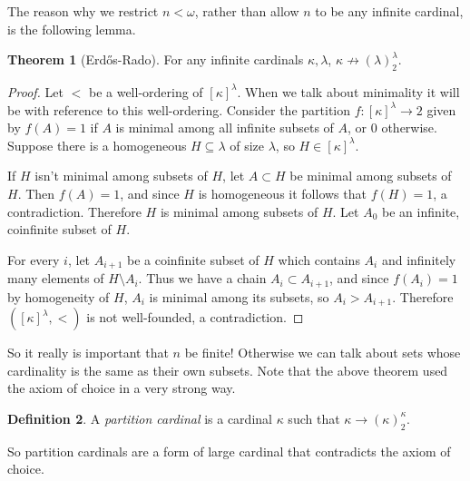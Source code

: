 \documentclass[12pt]{report}
\newcommand{\dfn}[1]{\emph{#1}\index{#1}}
\theoremstyle{definition}
\newtheorem{theorem}{Theorem}[chapter]
\newtheorem{definition}[theorem]{Definition}
\begin{document}
The reason why we restrict $n < \omega$, rather than allow $n$ to be any infinite cardinal, is the following lemma.
\begin{theorem}[Erdős-Rado]
For any infinite cardinals $\kappa,\lambda$, $\kappa \not\to (\lambda)^\lambda_2$.
\end{theorem}
\begin{proof}
Let $<$ be a well-ordering of $[\kappa]^\lambda$. When we talk about minimality it will be with reference to this well-ordering.
Consider the partition $f: [\kappa]^\lambda \to 2$ given by $f(A) = 1$ if $A$ is minimal among all infinite subsets of $A$, or $0$ otherwise.
Suppose there is a homogeneous $H \subseteq \lambda$ of size $\lambda$, so $H \in [\kappa]^\lambda$.

If $H$ isn't minimal among subsets of $H$, let $A \subset H$ be minimal among subsets of $H$. Then $f(A) = 1$, and since $H$ is homogeneous it follows that $f(H) = 1$, a contradiction.
Therefore $H$ is minimal among subsets of $H$. Let $A_0$ be an infinite, coinfinite subset of $H$.

For every $i$, let $A_{i+1}$ be a coinfinite subset of $H$ which contains $A_i$ and infinitely many elements of $H \setminus A_i$.
Thus we have a chain $A_i \subset A_{i+1}$, and since $f(A_i) = 1$ by homogeneity of $H$, $A_i$ is minimal among its subsets, so $A_i > A_{i+1}$.
Therefore $([\kappa]^\lambda, <)$ is not well-founded, a contradiction.
\end{proof}
So it really is important that $n$ be finite! Otherwise we can talk about sets whose cardinality is the same as their own subsets.
Note that the above theorem used the axiom of choice in a very strong way.
\begin{definition}
A \dfn{partition cardinal} is a cardinal $\kappa$ such that $\kappa \to (\kappa)^\kappa_2$.
\end{definition}
So partition cardinals are a form of large cardinal that contradicts the axiom of choice.
\end{document}
